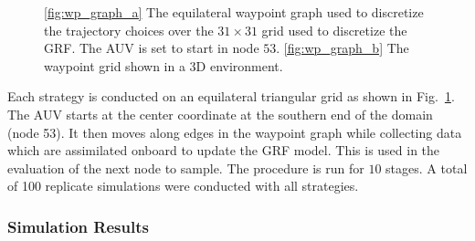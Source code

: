 \documentclass[aoas]{imsart}
\begin{document}
\begin{figure}[!b] 
\centering 
{}
\hfill
{}
\caption{\ref{fig:wp_graph_a} The equilateral waypoint graph used to discretize the
trajectory choices over the $31\times31$ grid used to discretize the GRF. The AUV is set to start in node $53$.
\ref{fig:wp_graph_b} The waypoint grid shown in a 3D environment.}
\label{fig:wp_graph}
\end{figure}

Each strategy is conducted on an equilateral triangular grid as shown in
Fig.~\ref{fig:wp_graph}. The AUV starts at the center coordinate at
the southern end of the domain (node 53). It then moves along edges in
the waypoint graph while collecting data which are assimilated onboard
to update the GRF model. This is used in the evaluation of the next
node to sample.  The procedure is run for $10$ stages. A total of 100
replicate simulations were conducted with all strategies.

\subsubsection{Simulation Results}
\end{document}
